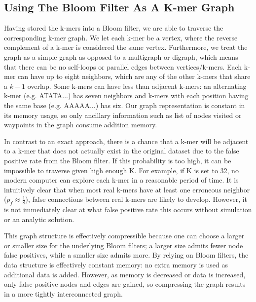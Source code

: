 \documentclass[12pt]{article} \usepackage{simplemargins}
\begin{document}
\subsection{Using The Bloom Filter As A K-mer Graph}
Having stored the k-mers into a Bloom filter, we are able to traverse
the corresponding k-mer graph. We let each k-mer be a vertex, where
the reverse complement of a k-mer is considered the same
vertex. Furthermore, we treat the graph as a simple graph as opposed
to a multigraph or digraph, which means that there can be no
self-loops or parallel edges between vertices/k-mers. Each k-mer can
have up to eight neighbors, which are any of the other k-mers that
 share a $k-1$ 
overlap. Some k-mers can have less than adjacent k-mers: an alternating k-mer
(e.g. ATATA...) has seven neighbors and k-mers with each position
having the same base (e.g. AAAAA...) has six. Our graph representation is 
constant in its memory usage, so only ancillary information such as list of 
nodes visited or waypoints in the graph consume addition memory.
 
In contrast to an exact
approach, there is a chance that a k-mer will be adjacent to a k-mer
that does not actually exist in the original dataset due to the false
positive rate from the Bloom filter. If this probability is too high,
it can be impossible to traverse given high enough K. For example, if
K is set to 32, no modern computer can explore each k-mer in a
reasonable period of time. It is intuitively clear that when most real k-mers 
have at least one erroneous neighbor ($p_f \approx \frac{1}{8}$), false connections 
between real k-mers are likely to develop. However, it is not immediately clear 
at what false positive rate this occurs without simulation or an analytic 
solution.

This graph structure is effectively compressible because one can choose a larger 
or smaller size for the underlying Bloom filters; a larger size admits fewer 
node false positives, while a smaller size admits more. By relying on Bloom 
filters, the data structure is effectively constant memory: no extra memory is 
used as additional data is added. However, as memory is decreased or data 
is increased, only false positive nodes and edges are gained, so 
compressing the graph results in a more tightly interconnected graph.
\end{document}

